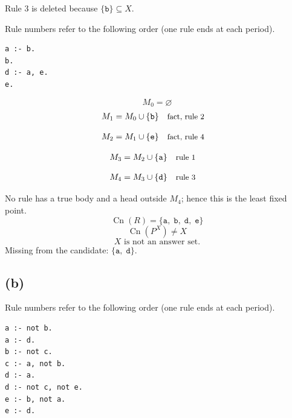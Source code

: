 \documentclass[a4paper,11pt]{article}
\newif\ifexplain
\newcommand{\explain}[1]{\ifexplain\begin{erklbox}#1\end{erklbox}\fi}
\newcommand{\why}[1]{\text{\small #1}}
\newcommand{\teil}[1]{\subsection*{(#1)}}
\newcommand{\at}[1]{\texttt{#1}}
\begin{document}
Rule 3 is deleted because $\{\at{b}\}\subseteq X$.

Rule numbers refer to the following order (one rule ends at each period).
\begin{small}
\begin{verbatim}
a :- b.
b.
d :- a, e.
e.
\end{verbatim}
\end{small}
\explain{Beim Redukt bleibt die Kandidatenmenge fest. Wir entscheiden zuerst, welche Regeln wegfallen. Erst danach berechnen wir aus den verbleibenden positiven Regeln die kleinste abgeschlossene Menge. Ein Modell allein reicht nicht: Diese Menge muss genau der Kandidat sein.}
\[
M_0=\varnothing
\]
\begin{align*}
M_{1} &= M_{0}\cup \{\at{b}\} && \why{fact, rule 2}
\end{align*}
\explain{Diese Regel hat keinen Körper. Ihr Kopf $\at{b}$ ist damit ein Fakt und muss in die Menge.}
\begin{align*}
M_{2} &= M_{1}\cup \{\at{e}\} && \why{fact, rule 4}
\end{align*}
\explain{Diese Regel hat keinen Körper. Ihr Kopf $\at{e}$ ist damit ein Fakt und muss in die Menge.}
\begin{align*}
M_{3} &= M_{2}\cup \{\at{a}\} && \why{rule 1}
\end{align*}
\explain{Für $\at{a}$ brauchen wir $\at{b}$. Weil diese Voraussetzungen bereits hergeleitet sind, dürfen wir den Regelkopf jetzt aufnehmen und alle bisherigen Atome behalten; bei einer fehlenden Voraussetzung würde diese Regel dagegen noch nichts beitragen.}
\begin{align*}
M_{4} &= M_{3}\cup \{\at{d}\} && \why{rule 3}
\end{align*}
\explain{Für $\at{d}$ brauchen wir $\at{a}$ und $\at{e}$. Weil diese Voraussetzungen bereits hergeleitet sind, dürfen wir den Regelkopf jetzt aufnehmen und alle bisherigen Atome behalten; bei einer fehlenden Voraussetzung würde diese Regel dagegen noch nichts beitragen.}
No rule has a true body and a head outside $M_{4}$; hence this is the least fixed point.
\[
\operatorname{Cn}(R)=\{\at{a},\;\at{b},\;\at{d},\;\at{e}\}
\]
\[
\operatorname{Cn}(P^X)\ne X
\]
\[
\boxed{X\text{ is not an answer set.}}
\]
Missing from the candidate: $\{\at{a},\;\at{d}\}$.
\teil{b}
Rule numbers refer to the following order (one rule ends at each period).
\begin{small}
\begin{verbatim}
a :- not b.
a :- d.
b :- not c.
c :- a, not b.
d :- a.
d :- not c, not e.
e :- b, not a.
e :- d.
\end{verbatim}
\end{small}
\explain{Die Körper mit \texttt{not} prüfen, ob ein Atom im Kandidaten fehlt. Die Regel für $d$ gilt nur dann, wenn sowohl $c$ als auch $e$ fehlen. Die Regeln für $a$, $d$ und $e$ enthalten positive Abhängigkeiten; ein solcher Kreis reicht allein nicht als Begründung. Darum wird jede Kandidatenmenge über ihr eigenes Redukt geprüft.}
\end{document}

